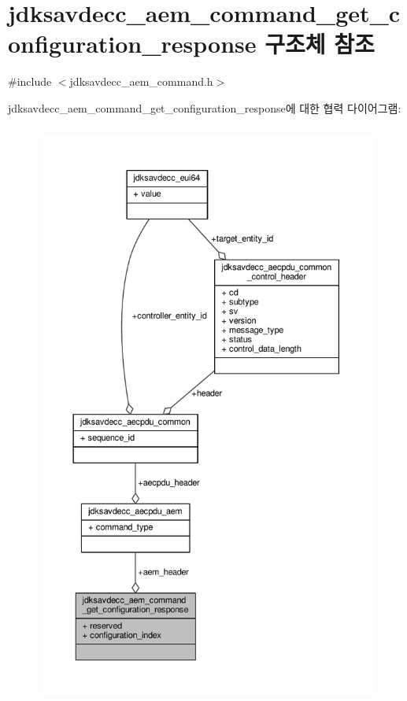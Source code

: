\hypertarget{structjdksavdecc__aem__command__get__configuration__response}{}\section{jdksavdecc\+\_\+aem\+\_\+command\+\_\+get\+\_\+configuration\+\_\+response 구조체 참조}
\label{structjdksavdecc__aem__command__get__configuration__response}


{\ttfamily \#include $<$jdksavdecc\+\_\+aem\+\_\+command.\+h$>$}



jdksavdecc\+\_\+aem\+\_\+command\+\_\+get\+\_\+configuration\+\_\+response에 대한 협력 다이어그램\+:
\nopagebreak
\begin{figure}[H]
\begin{center}
\leavevmode
\includegraphics[height=550pt]{structjdksavdecc__aem__command__get__configuration__response__coll__graph}
\end{center}
\end{figure}
